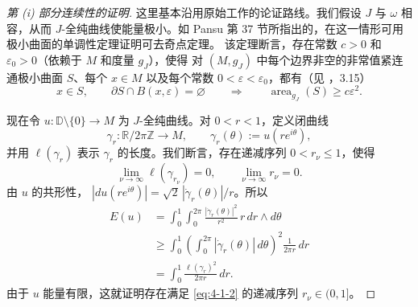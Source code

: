 \begin{proof}[第 \textup{(i)} 部分连续性的证明]
这里基本沿用原始工作的论证路线。我们假设
$J$ 与 $\omega$ 相容，从而 $J$-全纯曲线使能量极小。如 Pansu
 第 37 节所指出的，在这一情形可用极小曲面的单调性定理证明可去奇点定理。
该定理断言，存在常数 $c>0$ 和 $\varepsilon_0>0$（依赖于 $M$ 和度量 $g_J$），使得
对 $(M,g_J)$ 中每个边界非空的非常值紧连通极小曲面 $S$、每个 $x\in M$ 以及每个常数
$0<\varepsilon<\varepsilon_0$，都有（见 ，3.15）
\begin{equation}\label{eq:4-1-1}
  x\in S,\qquad
  \partial S\cap B(x,\varepsilon)=\varnothing
  \qquad\Longrightarrow\qquad
  \operatorname{area}_{g_J}(S)\ge c\varepsilon^2.
\end{equation}

现在令
$u:\mathbb D\setminus\{0\}\to M$ 为 $J$-全纯曲线。对 $0<r<1$，定义闭曲线
\[
  \gamma_r:\mathbb R/2\pi\mathbb Z\longrightarrow M,
  \qquad
  \gamma_r(\theta):=u(re^{i\theta}),
\]
并用 $\ell(\gamma_r)$ 表示 $\gamma_r$ 的长度。我们断言，存在递减序列
$0<r_\nu\le1$，使得
\begin{equation}\label{eq:4-1-2}
  \lim_{\nu\to\infty}\ell(\gamma_{r_\nu})=0,
  \qquad
  \lim_{\nu\to\infty}r_\nu=0.
\end{equation}
由 $u$ 的共形性，
$|du(re^{i\theta})|=\sqrt2\,|\dot\gamma_r(\theta)|/r$。所以
\[
\begin{aligned}
  E(u)
  &=
  \int_0^1\int_0^{2\pi}
  \frac{|\dot\gamma_r(\theta)|^2}{r^2}\,
  r\,dr\wedge d\theta
  \\
  &\ge
  \int_0^1
  \left(\int_0^{2\pi}|\dot\gamma_r(\theta)|\,d\theta\right)^2
  \frac{1}{2\pi r}\,dr
  \\
  &=
  \int_0^1\frac{\ell(\gamma_r)^2}{2\pi r}\,dr.
\end{aligned}
\]
由于 $u$ 能量有限，这就证明存在满足 \eqref{eq:4-1-2} 的递减序列
$r_\nu\in(0,1]$。


\end{proof}
